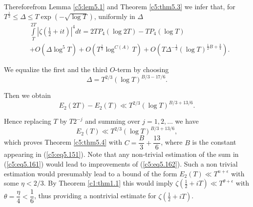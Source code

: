 Therefore\pageoriginale from Lemma \ref{c5:lem5.1} and Theorem
\ref{c5:thm5.3} we infer that, for $T^{\frac{1}{2}} \leq \Delta \leq T
\exp (-\sqrt{\log T})$, uniformly in $\Delta$ 
\begin{align*}
& \int\limits^{2T}_T \left|\zeta \left(\frac{1}{2}+ it
  \right)\right|^4 dt  = 2TP_4 (\log 2T) - T P_4 (\log T)\\ 
& + O (\Delta \log^5 T) + O \left(T^{\frac{1}{2}} \log^{C(A)} T\right) + O
  \left(T\Delta^{-\frac{1}{2}} (\log T)^{\frac{1}{2} B +
    \frac{3}{4}}\right).  
\end{align*}

We equalize the first and the third $O$-term by choosing 
$$
\Delta = T^{2/3} (\log T)^{B/3 - 17/6} .
$$

Then we obtain
$$
E_2 (2T) - E_2(T) \ll T^{2/3} (\log T)^{B/3 + 13 /6} .
$$

Hence replacing $T$ by $T 2^{-j}$ and summing over $j = 1,2,\ldots$ we
have  
\begin{equation}
E_2 (T) \ll T^{2/3} (\log T)^{B/3 + 13 /6} ,\label{c5:eq5.162} 
\end{equation}
which proves Theorem \ref{c5:thm5.4} with $C = \dfrac{B}{3} +
\dfrac{13}{6}$, where $B$ is the constant appearing in
(\ref{c5:eq5.151}). Note that any non-trivial estimation of the sum in
(\ref{c5:eq5.161}) would lead to improvements of
(\ref{c5:eq5.162}). Such a non trivial estimation would presumably
lead to a bound of the form $E_2 (T) \ll T^{n+ \epsilon}$ with some
$\eta < 2/3$. By Theorem \ref{c1:thm1.1} this would imply
$\zeta(\frac{1}{2} + iT) \ll T^{\theta + \epsilon}$ with $\theta =
\dfrac{\eta}{4} < \dfrac{1}{6}$, thus providing a nontrivial estimate
for $\zeta(\frac{1}{2} + iT)$. 

